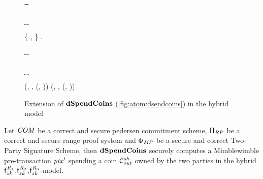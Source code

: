 \begin{figure}
\begin{center}
{\begin{varwidth}{\textwidth}
{            \< \sendmessageleft*{\funStarAlt{\varPreTx}} \< \\
            \color{blue} \pcif {}  \\
            \color{blue} \t \pcreturn \cnstFalsum \\
            \color{blue} \pcif {}  \\
            \color{blue} \t \pcreturn \cnstFalsum \\
            \{ \varPubKey, \varRand \} \opFunResult \funStarAlt{\varPreTx}.\varSigContext \\
            \color{blue} \pcif {}  \\
            \color{blue} \t \pcreturn \cnstFalsum \\
            \color{blue} \pcif {}  \\
            \color{blue} \t \pcreturn \cnstFalsum \\
            \pcreturn (\funStarAlt{\varPreTx}, \funStar{\varSpendableCoinAlice}, (\varSecKeyAlice, \varNonceAlice)) \< \< \pcreturn (\funStarAlt{\varPreTx}, \funStar{\varSpendableCoinCarol}, (\varSecKeyCarol, \varNonceCarol))
            }
        \end{varwidth}
        }
    \end{center}
    \caption{Extension of $\mathbf{dSpendCoins}$ (\cref{fig:atom:dsendcoins}) in the hybrid model} \label{fig:atom:hybrid-dsend}
\end{figure}

\begin{theorem}
    \label{teo:atom:sec-dspend}
    Let $\mathit{COM}$ be a correct and secure pedersen commitment scheme, $\Pi_{RP}$ be a correct and secure range proof system and $\Phi_{\mathit{MP}}$ be a secure and correct Two-Party Signature Scheme, then $\mathbf{dSpendCoins}$ securely computes a Mimblewimble pre-transaction ${\mathit{ptx}}'$ spending a coin $\mathcal{C}_{\mathit{out}}^{\mathit{sh}}$ owned by the two parties in the hybrid $\mathsf{f}^{\mathit{R}_1}_{zk}$,$\mathsf{f}^{\mathit{R}_2}_{zk}$,$\mathsf{f}^{\mathit{R}_3}_{zk}$-model.
\end{theorem}

